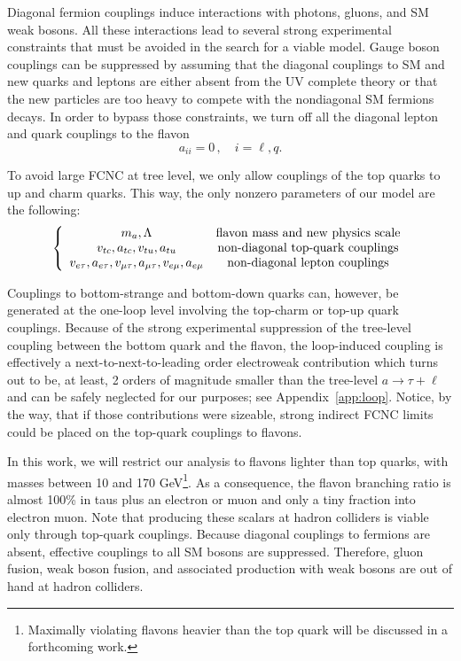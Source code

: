 \documentclass[prd,amsfonts,onecolumn,superscriptaddress,aps,nofootinbib,11pt]{revtex4-1}
\begin{document}
Diagonal fermion couplings induce interactions with photons, gluons, and SM weak bosons. All these interactions lead to several strong experimental constraints that must be avoided in the search for a viable model. Gauge boson couplings can be suppressed by assuming that the diagonal couplings to SM and new quarks and leptons are either absent from the UV complete theory or that the new particles are too heavy to compete with the nondiagonal SM fermions decays. In order to bypass those constraints, we turn off all the diagonal lepton and quark couplings to the flavon %
\begin{equation}
a_{ii} = 0 \,, \quad i=\ell, q.
\end{equation}

To avoid large FCNC at tree level, we only allow couplings of the top quarks to up and charm quarks. This way, the only nonzero parameters of our model are the following:
\begin{equation}
\left\{
    \begin{array}{cc}
m_a, \Lambda & \hbox{flavon mass and new physics scale} \\
v_{tc}, a_{tc}, v_{tu}, a_{tu} & \hbox{non-diagonal top-quark couplings} \\
v_{e\tau}, a_{e\tau}, v_{\mu\tau}, a_{\mu\tau}, v_{e\mu}, a_{e\mu} & \hbox{non-diagonal lepton couplings}
    \end{array}
    \right.
\end{equation}

Couplings to bottom-strange and bottom-down quarks can, however, be generated at the one-loop level involving the top-charm or top-up quark couplings. Because of the strong experimental suppression of the tree-level coupling between the bottom quark and the flavon,  the loop-induced coupling is effectively a next-to-next-to-leading order electroweak contribution which turns out to be, at least, 2 orders of magnitude smaller than the tree-level $a\to \tau+\ell$ and can be safely neglected for our purposes; see Appendix~\ref{app:loop}. Notice, by the way, that if those contributions were sizeable, strong indirect FCNC limits could be placed on the top-quark couplings to flavons.

In this work, we will restrict our analysis to flavons lighter than top quarks, with masses between 10 and 170 GeV\footnote{Maximally violating flavons heavier than the top quark will be discussed in a forthcoming work.}. As a consequence,  the flavon branching ratio is almost 100\% in taus plus an electron or muon and only a tiny fraction into electron muon. Note that producing these scalars at hadron colliders is viable only through top-quark couplings. Because diagonal couplings to fermions are absent, effective couplings to all SM bosons are suppressed. Therefore, gluon fusion, weak boson fusion, and associated production with weak bosons are out of hand at hadron colliders.
\end{document}
